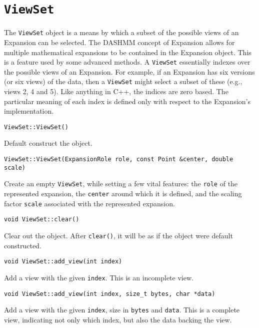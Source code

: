 \section{\texttt{ViewSet}}

The \texttt{ViewSet} object is a means by which a subset of the possible views
of an Expansion can be selected. The DASHMM concept of Expansion allows for
multiple mathematical expansions to be contained in the Expansion object. This
is a feature used by some advanced methods. A \texttt{ViewSet} essentially
indexes over the possible views of an Expansion. For example, if an
Expansion has six versions (or six views) of the data, then a \texttt{ViewSet}
might select a subset of these (e.g., views 2, 4 and 5). Like anything in C++,
the indices are zero based. The particular meaning of each index is defined
only with respect to the Expansion's implementation.

\begin{lstlisting}
ViewSet::ViewSet()
\end{lstlisting}

\noindent Default construct the object.

\begin{lstlisting}
ViewSet::ViewSet(ExpansionRole role, const Point &center, double scale)
\end{lstlisting}

\noindent Create an empty \texttt{ViewSet}, while setting a few vital features:
the \texttt{role} of the represented expansion, the \texttt{center} around
which it is defined, and the scaling factor \texttt{scale} associated with the
represented expansion.

\begin{lstlisting}
void ViewSet::clear()
\end{lstlisting}

\noindent Clear out the object. After \texttt{clear()}, it will be as if the
object were default constructed.

\begin{lstlisting}
void ViewSet::add_view(int index)
\end{lstlisting}

\noindent Add a view with the given \texttt{index}. This is an incomplete view.

\begin{lstlisting}
void ViewSet::add_view(int index, size_t bytes, char *data)
\end{lstlisting}

\noindent Add a view with the given \texttt{index}, size in \texttt{bytes} and
\texttt{data}. This is a complete view, indicating not only which index, but
also the data backing the view.

